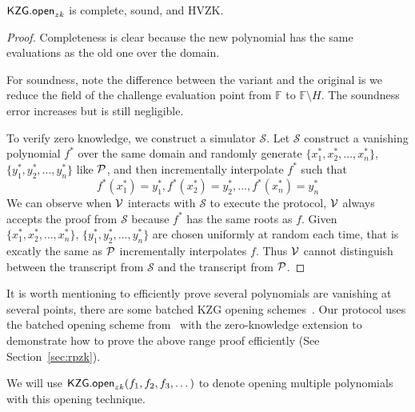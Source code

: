 \begin{theorem}
\label{thm:openzk}
$\mathsf{KZG.open}_{zk}$ is complete, sound, and HVZK.
\end{theorem}
\begin{proof}
Completeness is clear because the new polynomial has the same evaluations as the old one over the domain.

For soundness, note the difference between the variant and the original is we reduce the field of the challenge evaluation point from $\mathbb{F}$ to $\mathbb{F}\setminus{H}$. The soundness error increases but is still negligible.

To verify zero knowledge, we construct a simulator $\mathcal{S}$. Let $\mathcal{S}$ construct a vanishing polynomial $f^*$ over the same domain and randomly generate $\{x_1^*,x_2^*,\dots,x_n^*\}$, $\{y_1^*,y_2^*,\dots,y_n^*\}$ like $\mathcal{P}$, and then incrementally interpolate $f^*$ such that
\[ f^*(x_1^*)=y_1^*,f^*(x_2^*)=y_2^*,\dots,f^*(x_n^*)=y_n^* \]
We can observe when $\mathcal{V}$ interacts with $\mathcal{S}$ to execute the protocol, $\mathcal{V}$ always accepts the proof from $\mathcal{S}$ because $f^*$ has the same roots as $f$. Given $\{x_1^*,x_2^*,\dots,x_n^*\}$, $\{y_1^*,y_2^*,\dots,y_n^*\}$ are chosen uniformly at random each time, that is excatly the same as $\mathcal{P}$ incrementally interpolates $f$. Thus $\mathcal{V}$ cannot distinguish between the transcript from $\mathcal{S}$ and the transcript from $\mathcal{P}$.
\end{proof}
It is worth mentioning to efficiently prove several polynomials are vanishing at several points, there are some batched KZG opening schemes~\cite{plonk,bdfg,fflonk}. Our protocol uses the batched opening scheme from~\cite{plonk} with the zero-knowledge extension to demonstrate how to prove the above range proof efficiently (See Section~\ref{sec:rpzk}).

We will use $\mathsf{KZG.open}_{zk}(f_1,f_2,f_3,\dots)$ to denote opening multiple polynomials with this opening technique.

